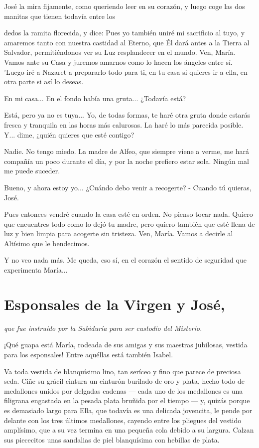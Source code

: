 \documentclass[12pt]{book} %
\begin{document}
José la mira fijamente, como queriendo leer en su corazón, y luego coge las dos manitas que tienen todavía entre los 

dedos la ramita florecida, y dice: Pues yo también uniré mi sacrificio al tuyo, y amaremos tanto con nuestra castidad al Eterno, que Él dará antes a la Tierra al Salvador, permitiéndonos ver su Luz resplandecer en el mundo. Ven, María. Vamos ante su Casa y juremos amarnos como lo hacen los ángeles entre sí. 'Luego iré a Nazaret a prepararlo todo para ti, en tu casa si quieres ir a ella, en otra parte si así lo deseas. 

En mi casa... En el fondo había una gruta... ¿Todavía está? 

Está, pero ya no es tuya... Yo, de todas formas, te haré otra gruta donde estarás fresca y tranquila en las horas más calurosas. La haré lo más parecida posible. Y... dime, ¿quién quieres que esté contigo? 

Nadie. No tengo miedo. La madre de Alfeo, que siempre viene a verme, me hará compañía un poco durante el día, y por la noche prefiero estar sola. Ningún mal me puede suceder. 

Bueno, y ahora estoy yo... ¿Cuándo debo venir a recogerte? - Cuando tú quieras, José. 

Pues entonces vendré cuando la casa esté en orden. No pienso tocar nada. Quiero que encuentres todo como lo dejó tu madre, pero quiero también que esté llena de luz y bien limpia para acogerte sin tristeza. Ven, María. Vamos a decirle al Altísimo que le bendecimos. 

Y no veo nada más. Me queda, eso sí, en el corazón el sentido de seguridad que experimenta María... 
 
\chapter{Esponsales de la Virgen y José,}
\emph{que fue instruido por la Sabiduría para ser custodio del Misterio.}
 
¡Qué guapa está María, rodeada de sus amigas y sus maestras jubilosas, vestida para los esponsales! Entre aquéllas está también Isabel. 

Va toda vestida de blanquísimo lino, tan seríceo y fino que parece de preciosa seda. Ciñe su grácil cintura un cinturón burilado de oro y plata, hecho todo de medallones unidos por delgadas cadenas — cada uno de los medallones es una filigrana engastada en la pesada plata bruñida por el tiempo — y, quizás porque es demasiado largo para Ella, que todavía es una delicada jovencita, le pende por delante con los tres últimos medallones, cayendo entre los pliegues del vestido amplísimo, que a su vez termina en una pequeña cola debido a su largura. Calzan sus piececitos unas sandalias de piel blanquísima con hebillas de plata. 
\end{document}
